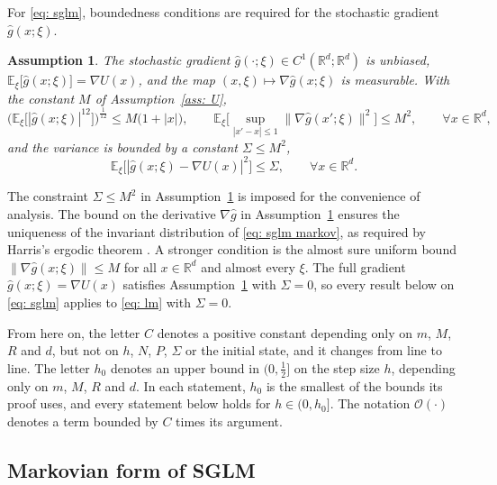 \documentclass{article}
\newtheorem{assumption}{Assumption}
\newcommand{\Le}{\leqslant}
\newcommand{\norm}[1]{\lVert #1 \rVert}
\numberwithin{equation}{section}
\begin{document}
For \eqref{eq: sglm}, boundedness conditions are required for the stochastic gradient $\hat g(x;\xi)$.

\begin{assumption}
	\label{ass: sg}
	The stochastic gradient $\hat g(\cdot;\xi) \in C^1(\mathbb R^d; \mathbb R^d)$ is unbiased, $\mathbb E_\xi\big[\hat g(x;\xi)\big] = \nabla U(x)$, and the map $(x,\xi) \mapsto \nabla \hat g(x;\xi)$ is measurable.
	With the constant $M$ of Assumption~\ref{ass: U},
	\begin{equation*}
		\Big( \mathbb E_\xi \big[ |\hat g(x;\xi)|^{12} \big] \Big)^{\frac{1}{12}} \Le M \bigl( 1 + |x| \bigr) , \qquad
		\mathbb E_\xi \bigg[ \sup_{|x'-x| \Le 1} \norm{\nabla \hat g(x';\xi)}^2 \bigg] \Le M^2 , \qquad
		\forall x \in \mathbb R^d ,
	\end{equation*}
	and the variance is bounded by a constant $\Sigma \Le M^2$,
	\begin{equation*}
		\mathbb E_\xi \big[ |\hat g(x;\xi) - \nabla U(x)|^2 \big] \Le \Sigma , \qquad
		\forall x \in \mathbb R^d .
	\end{equation*}
\end{assumption}

The constraint $\Sigma \Le M^2$ in Assumption~\ref{ass: sg} is imposed for the convenience of analysis. The bound on the derivative $\nabla \hat g$ in Assumption~\ref{ass: sg} ensures the uniqueness of the invariant distribution of \eqref{eq: sglm markov}, as required by Harris's ergodic theorem \citep{hairer2008yet}. A stronger condition is the almost sure uniform bound $\norm{\nabla \hat g(x;\xi)} \Le M$ for all $x \in \mathbb R^d$ and almost every $\xi$. The full gradient $\hat g(x;\xi) = \nabla U(x)$ satisfies Assumption~\ref{ass: sg} with $\Sigma = 0$, so every result below on \eqref{eq: sglm} applies to \eqref{eq: lm} with $\Sigma = 0$.

From here on, the letter $C$ denotes a positive constant depending only on $m$, $M$, $R$ and $d$, but not on $h$, $N$, $P$, $\Sigma$ or the initial state, and it changes from line to line. The letter $h_0$ denotes an upper bound in $(0,\frac12]$ on the step size $h$, depending only on $m$, $M$, $R$ and $d$. In each statement, $h_0$ is the smallest of the bounds its proof uses, and every statement below holds for $h \in (0,h_0]$. The notation $\mathcal O(\cdot)$ denotes a term bounded by $C$ times its argument.

\subsection{Markovian form of SGLM}
\end{document}

